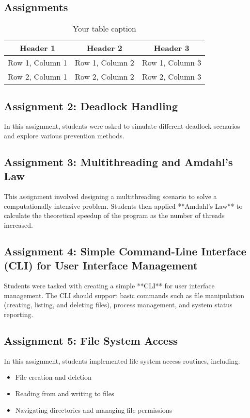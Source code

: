 \documentclass[12pt]{article}
\begin{document}
\subsection{Assignments}
\begin{table}[h]
    \centering
    \begin{tabular}{|c|c|c|} 
    \hline
    Header 1 & Header 2 & Header 3 \\ %
    \hline
    Row 1, Column 1 & Row 1, Column 2 & Row 1, Column 3 \\ %
    \hline
    Row 2, Column 1 & Row 2, Column 2 & Row 2, Column 3 \\ %
    \hline
    \end{tabular}
    \caption{Your table caption} %
    \label{tab:your_label} %
\end{table}

\subsection{Assignment 2: Deadlock Handling}
In this assignment, students were asked to simulate different deadlock scenarios and explore various prevention methods.

\subsection{Assignment 3: Multithreading and Amdahl's Law}
This assignment involved designing a multithreading scenario to solve a computationally intensive problem. Students then applied **Amdahl's Law** to calculate the theoretical speedup of the program as the number of threads increased.

\subsection{Assignment 4: Simple Command-Line Interface (CLI) for User Interface Management}
Students were tasked with creating a simple **CLI** for user interface management. The CLI should support basic commands such as file manipulation (creating, listing, and deleting files), process management, and system status reporting.

\subsection{Assignment 5: File System Access}
In this assignment, students implemented file system access routines, including:
\begin{itemize}
    \item File creation and deletion
    \item Reading from and writing to files
    \item Navigating directories and managing file permissions
\end{itemize}
\end{document}
